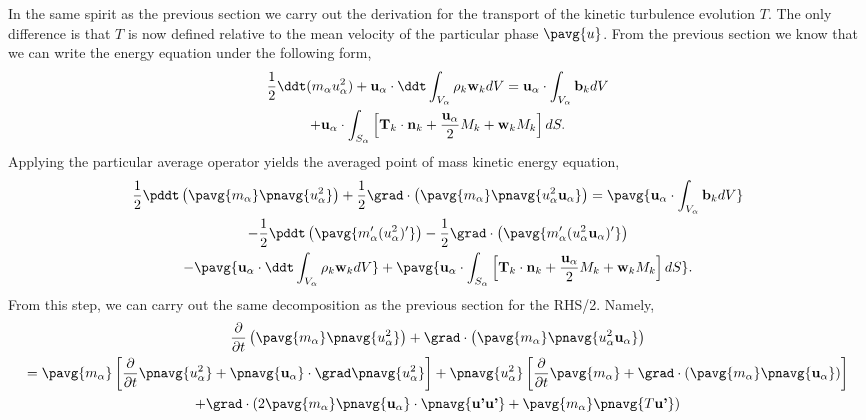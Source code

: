 In the same spirit as the previous section we carry out the derivation for the transport of the kinetic turbulence evolution $T$. 
The only difference is that $T$ is now defined relative to the mean velocity of the particular phase $\pavg{u}$.  
From the previous section we know that we can write the energy equation under the following form, 
\begin{multline*}
    \frac{1}{2}\ddt (m_\alpha u^2_\alpha)
    + \textbf{u}_\alpha \cdot \ddt \int_{V_\alpha} \rho_k \textbf{w}_k dV 
    = \textbf{u}_\alpha \cdot \int_{V_\alpha} \textbf{b}_k dV\\
    + \textbf{u}_\alpha \cdot \int_{S_\alpha} \left[
    \textbf{T}_k \cdot\textbf{n}_k
    +\frac{\textbf{u}_\alpha}{2} M_k
    +\textbf{w}_k M_k
    \right]dS.
\end{multline*}
Applying the particular average operator yields the averaged point of mass kinetic energy equation, 
\begin{multline*}
    \frac{1}{2}\pddt   \left(\pavg{m_\alpha} \pnavg{u^2_\alpha}\right)
    + \frac{1}{2}\grad \cdot \left(\pavg{m_\alpha} \pnavg{u^2_\alpha \textbf{u}_\alpha}\right) 
    = \pavg{\textbf{u}_\alpha \cdot \int_{V_\alpha} \textbf{b}_k dV}\\
    - \frac{1}{2}\pddt \left(\pavg{m_\alpha'(u_\alpha^2)'}\right)
    - \frac{1}{2}\grad\cdot\left(\pavg{m_\alpha' (u_\alpha^2 \textbf{u}_\alpha)'}\right)\\
    - \pavg{\textbf{u}_\alpha \cdot \ddt \int_{V_\alpha} \rho_k \textbf{w}_k dV} 
    + \pavg{\textbf{u}_\alpha \cdot \int_{S_\alpha} \left[
    \textbf{T}_k \cdot\textbf{n}_k
    +\frac{\textbf{u}_\alpha}{2} M_k
    +\textbf{w}_k M_k
    \right]dS}.
\end{multline*}
From this step, we can carry out the same decomposition as the previous section for the RHS/2. 
Namely, 
\begin{multline*}
    \frac{\partial }{\partial t}\left(
        \pavg{m_\alpha}
        \pnavg{u^2_\alpha}
    \right)+
    \grad\cdot \left(
        \pavg{m_\alpha}
        \pnavg{u^2_\alpha\textbf{u}_\alpha}
    \right) \\
    =
    \pavg{m_\alpha}
    \left[
        \frac{\partial }{\partial t}\pnavg{u^2_\alpha}
        + 
        \pnavg{\textbf{u}_\alpha}
        \cdot\grad 
        \pnavg{u^2_\alpha}
    \right]
    +\pnavg{u^2_\alpha} \left[
        \frac{\partial }{\partial t}\pavg{m_\alpha}
        + \grad\cdot \left(
            \pavg{m_\alpha}
            \pnavg{\textbf{u}_\alpha}
        \right)
    \right]\\
    + \grad\cdot \left(
        2\pavg{m_\alpha}
        \pnavg{\textbf{u}_\alpha}\cdot\pnavg{\textbf{u'}\textbf{u'}} 
        + \pavg{m_\alpha} \pnavg{T \textbf{u'}}
    \right)
\end{multline*}
